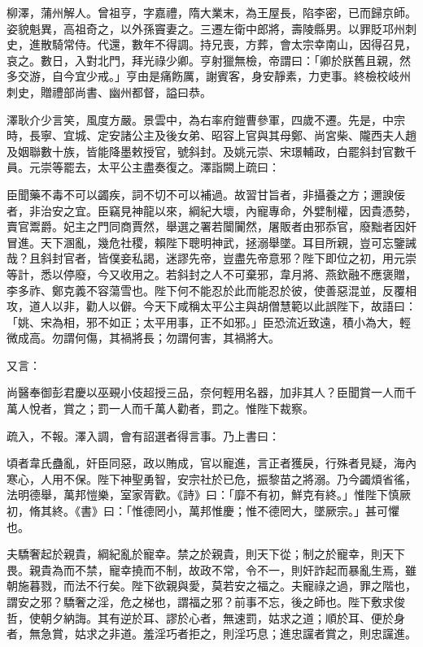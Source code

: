 \begin{pinyinscope}
 柳澤，蒲州解人。曾祖亨，字嘉禮，隋大業末，為王屋長，陷李密，已而歸京師。姿貌魁異，高祖奇之，以外孫竇妻之。三遷左衛中郎將，壽陵縣男。以罪貶邛州刺史，進散騎常侍。代還，數年不得調。持兄喪，方葬，會太宗幸南山，因得召見，哀之。數日，入對北門，拜光祿少卿。亨射獵無檢，帝謂曰：「卿於朕舊且親，然多交游，自今宜少戒。」亨由是痛飭厲，謝賓客，身安靜素，力吏事。終檢校岐州刺史，贈禮部尚書、幽州都督，謚曰恭。



 澤耿介少言笑，風度方嚴。景雲中，為右率府鎧曹參軍，四歲不遷。先是，中宗時，長寧、宜城、定安諸公主及後女弟、昭容上官與其母鄭、尚宮柴、隴西夫人趙及姻聯數十族，皆能降墨敕授官，號斜封。及姚元崇、宋璟輔政，白罷斜封官數千員。元崇等罷去，太平公主盡奏復之。澤詣闕上疏曰：



 臣聞藥不毒不可以蠲疾，詞不切不可以補過。故習甘旨者，非攝養之方；邇諛佞者，非治安之宜。臣竊見神龍以來，綱紀大壞，內寵專命，外嬖制權，因貴憑勢，賣官鬻爵。妃主之門同商賈然，舉選之署若闤闠然，屠販者由邪忝官，廢黜者因奸冒進。天下溷亂，幾危社稷，賴陛下聰明神武，拯溺舉墜。耳目所親，豈可忘鑒誡哉？且斜封官者，皆僕妾私謁，迷謬先帝，豈盡先帝意邪？陛下即位之初，用元崇等計，悉以停廢，今又收用之。若斜封之人不可棄邪，韋月將、燕欽融不應褒贈，李多祚、鄭克義不容蕩雪也。陛下何不能忍於此而能忍於彼，使善惡混並，反覆相攻，道人以非，勸人以僻。今天下咸稱太平公主與胡僧慧範以此誤陛下，故語曰：「姚、宋為相，邪不如正；太平用事，正不如邪。」臣恐流近致遠，積小為大，輕微成高。勿謂何傷，其禍將長；勿謂何害，其禍將大。



 又言：



 尚醫奉御彭君慶以巫覡小伎超授三品，奈何輕用名器，加非其人？臣聞賞一人而千萬人悅者，賞之；罰一人而千萬人勸者，罰之。惟陛下裁察。



 疏入，不報。澤入調，會有詔選者得言事。乃上書曰：



 頃者韋氏蠱亂，奸臣同惡，政以賄成，官以寵進，言正者獲戾，行殊者見疑，海內寒心，人用不保。陛下神聖勇智，安宗社於已危，振黎苗之將溺。乃今蠲煩省徭，法明德舉，萬邦愷樂，室家胥歡。《詩》曰：「靡不有初，鮮克有終。」惟陛下慎厥初，脩其終。《書》曰：「惟德罔小，萬邦惟慶；惟不德罔大，墜厥宗。」甚可懼也。



 夫驕奢起於親貴，綱紀亂於寵幸。禁之於親貴，則天下從；制之於寵幸，則天下畏。親貴為而不禁，寵幸撓而不制，故政不常，令不一，則奸詐起而暴亂生焉，雖朝施暮戮，而法不行矣。陛下欲親與愛，莫若安之福之。夫寵祿之過，罪之階也，謂安之邪？驕奢之淫，危之梯也，謂福之邪？前事不忘，後之師也。陛下敷求俊哲，使朝夕納誨。其有逆於耳、謬於心者，無速罰，姑求之道；順於耳、便於身者，無急賞，姑求之非道。羞淫巧者拒之，則淫巧息；進忠讜者賞之，則忠讜進。




\end{pinyinscope}
